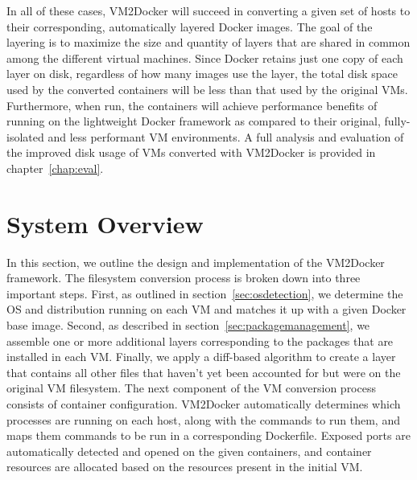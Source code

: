 In all of these cases, VM2Docker will succeed in converting a given set of hosts to their corresponding, automatically layered Docker images. The goal of the layering is to maximize the size and quantity of layers that are shared in common among the different virtual machines. Since Docker retains just one copy of each layer on disk, regardless of how many images use the layer, the total disk space used by the converted containers will be less than that used by the original VMs. Furthermore, when run, the containers will achieve performance benefits of running on the lightweight Docker framework as compared to their original, fully-isolated and less performant VM environments. A full analysis and evaluation of the improved disk usage of VMs converted with VM2Docker is provided in chapter~\ref{chap:eval}.

\section{System Overview}
\label{sec:sysoverview}
In this section, we outline the design and implementation of the VM2Docker framework. The filesystem conversion process is broken down into three important steps. First, as outlined in section~\ref{sec:osdetection}, we determine the OS and distribution running on each VM and matches it up with a given Docker base image. Second, as described in section~\ref{sec:packagemanagement}, we assemble one or more additional layers corresponding to the packages that are installed in each VM. Finally, we apply a diff-based algorithm to create a layer that contains all other files that haven't yet been accounted for but were on the original VM filesystem. The next component of the VM conversion process consists of container configuration. VM2Docker automatically determines which processes are running on each host, along with the commands to run them, and maps them commands to be run in a corresponding Dockerfile. Exposed ports are automatically detected and opened on the given containers, and container resources are allocated based on the resources present in the initial VM.

